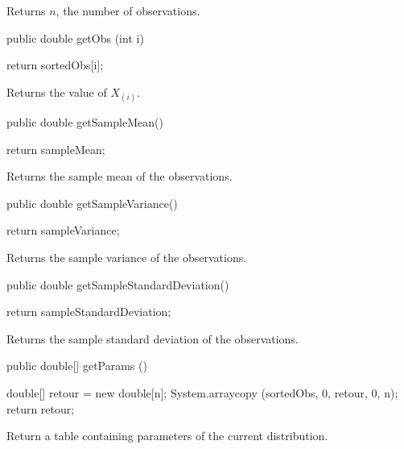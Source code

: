 \begin{tabb}   Returns $n$, the number of observations.
\end{tabb}
\begin{code}

   public double getObs (int i)\begin{hide} {
      return sortedObs[i];
   }\end{hide}
\end{code}
\begin{tabb}   Returns the value of $X_{(i)}$.
\end{tabb}
\begin{code}

   public double getSampleMean()\begin{hide} {
      return sampleMean;
   }\end{hide}
\end{code}
\begin{tabb}   Returns the sample mean of the observations.
\end{tabb}
\begin{code}

   public double getSampleVariance()\begin{hide} {
      return sampleVariance;
   }\end{hide}
\end{code}
\begin{tabb}   Returns the sample variance of the observations.
\end{tabb}
\begin{code}

   public double getSampleStandardDeviation()\begin{hide} {
      return sampleStandardDeviation;
   }\end{hide}
\end{code}
 \begin{tabb}   Returns the sample standard deviation of the observations.
 \end{tabb}
 \begin{code}

   public double[] getParams ()\begin{hide} {
      double[] retour = new double[n];
      System.arraycopy (sortedObs, 0, retour, 0, n);
      return retour;
   }\end{hide}
\end{code}
\begin{tabb}
   Return a table containing parameters of the current distribution.
\end{tabb}
